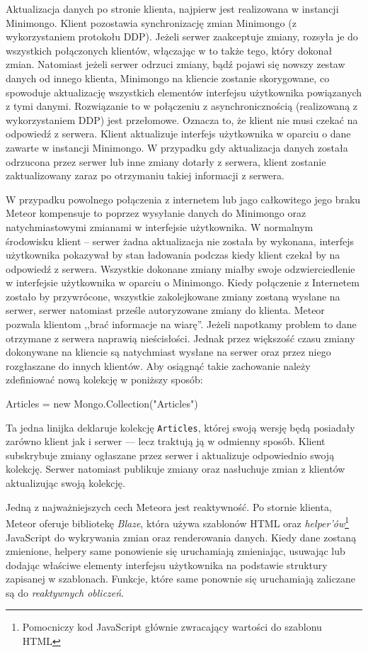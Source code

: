 Aktualizacja danych po stronie klienta, najpierw jest realizowana w instancji Minimongo. Klient pozostawia synchronizację zmian Minimongo (z wykorzystaniem protokołu DDP). Jeżeli serwer zaakceptuje zmiany, rozsyła je do wszystkich połączonych klientów, włączając w to także tego, który dokonał zmian. Natomiast jeżeli serwer odrzuci zmiany, bądź pojawi się nowszy zestaw danych od innego klienta, Minimongo na kliencie zostanie skorygowane, co spowoduje aktualizację wszystkich elementów interfejsu użytkownika powiązanych z tymi danymi. Rozwiązanie to w połączeniu z asynchronicznością (realizowaną z wykorzystaniem DDP) jest przełomowe. Oznacza to, że klient nie musi czekać na odpowiedź z serwera. Klient aktualizuje interfejs użytkownika w oparciu o dane zawarte w instancji Minimongo. W przypadku gdy aktualizacja danych została odrzucona przez serwer lub inne zmiany dotarły z serwera, klient zostanie zaktualizowany zaraz po otrzymaniu takiej informacji z serwera.

W przypadku powolnego połączenia z internetem lub jago całkowitego jego braku Meteor kompensuje to poprzez wysyłanie danych do Minimongo oraz natychmiastowymi zmianami w interfejsie użytkownika. W normalnym środowisku klient -- serwer żadna aktualizacja nie została by wykonana, interfejs użytkownika pokazywał by stan ładowania podczas kiedy klient czekał by na odpowiedź z serwera. Wszystkie dokonane zmiany miałby swoje odzwierciedlenie w interfejsie użytkownika w oparciu o Minimongo. Kiedy połączenie z Internetem zostało by przywrócone, wszystkie zakolejkowane zmiany zostaną wysłane na serwer, serwer natomiast prześle autoryzowane zmiany do klienta. Meteor pozwala klientom ,,brać informacje na wiarę''. Jeżeli napotkamy problem to dane otrzymane z serwera naprawią nieścisłości. Jednak przez większość czasu zmiany dokonywane na kliencie są natychmiast wysłane na serwer oraz przez niego rozgłaszane do innych klientów. Aby osiągnąć takie zachowanie należy zdefiniować nową kolekcję w poniższy sposób: 
\begin{js}[caption={Definicja kolekcji}]
  Articles = new Mongo.Collection("Articles")
\end{js}
Ta jedna linijka deklaruje kolekcję \verb|Articles|, której swoją wersję będą posiadały zarówno klient jak i serwer --- lecz traktują ją w odmienny sposób. Klient subskrybuje zmiany ogłaszane przez serwer i aktualizuje odpowiednio swoją kolekcję. Serwer natomiast publikuje zmiany oraz nasłuchuje zmian z klientów aktualizując swoją kolekcję.

Jedną z najważniejszych cech Meteora jest reaktywność. Po stornie klienta, Meteor oferuje bibliotekę \emph{Blaze}, która używa szablonów HTML oraz \emph{helper'ów}\footnote{Pomocniczy kod JavaScript głównie zwracający wartości do szablonu HTML} JavaScript do wykrywania zmian oraz renderowania danych. Kiedy dane zostaną zmienione, helpery same ponowienie się uruchamiają zmieniając, usuwając lub dodając właściwe elementy interfejsu użytkownika na podstawie struktury zapisanej w szablonach. Funkcje, które same ponownie się uruchamiają zaliczane są do \emph{reaktywnych obliczeń}\cite{strack15}.   


